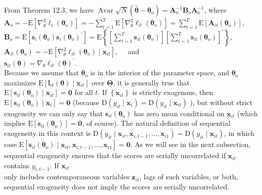\documentclass[10pt]{article}
\begin{document}
From Theorem 12.3, we have $\operatorname{Avar} \sqrt{N}\left(\hat{\boldsymbol{\theta}}-\boldsymbol{\theta}_{\mathrm{o}}\right)=\mathbf{A}_{\mathrm{o}}^{-1} \mathbf{B}_{\mathrm{o}} \mathbf{A}_{\mathrm{o}}^{-1}$, where\\
$\mathbf{A}_{\mathrm{o}}=-\mathrm{E}\left[\nabla_{\theta}^{2} \ell_{i}\left(\boldsymbol{\theta}_{\mathrm{o}}\right)\right]=-\sum_{t=1}^{T} \mathrm{E}\left[\nabla_{\theta}^{2} \ell_{i t}\left(\boldsymbol{\theta}_{\mathrm{o}}\right)\right]=\sum_{t=1}^{T} \mathrm{E}\left[\mathbf{A}_{i t}\left(\boldsymbol{\theta}_{\mathrm{o}}\right)\right]$,\\
$\mathbf{B}_{\mathrm{o}}=\mathrm{E}\left[\mathbf{s}_{i}\left(\boldsymbol{\theta}_{\mathrm{o}}\right) \mathbf{s}_{i}\left(\boldsymbol{\theta}_{\mathrm{o}}\right)^{\prime}\right]=\mathrm{E}\left\{\left[\sum_{t=1}^{T} \mathbf{s}_{i t}\left(\boldsymbol{\theta}_{\mathrm{o}}\right)\right]\left[\sum_{t=1}^{T} \mathbf{s}_{i t}\left(\boldsymbol{\theta}_{\mathrm{o}}\right)\right]^{\prime}\right\}$,\\
$\mathbf{A}_{i t}\left(\boldsymbol{\theta}_{\mathrm{o}}\right)=-\mathrm{E}\left[\nabla_{\theta}^{2} \ell_{i t}\left(\boldsymbol{\theta}_{\mathrm{o}}\right) \mid \mathbf{x}_{i t}\right], \quad$ and\\
$\mathbf{s}_{i t}(\boldsymbol{\theta})=\nabla_{\theta} \ell_{i t}(\boldsymbol{\theta})^{\prime}$.\\
Because we assume that $\boldsymbol{\theta}_{\mathrm{o}}$ is in the interior of the parameter space, and $\boldsymbol{\theta}_{\mathrm{o}}$ maximizes $\mathrm{E}\left[\boldsymbol{l}_{i t}(\boldsymbol{\theta}) \mid \mathbf{x}_{i t}\right]$ over $\boldsymbol{\Theta}$, it is generally true that $\mathrm{E}\left[\mathbf{s}_{i t}\left(\boldsymbol{\theta}_{\mathrm{o}}\right) \mid \mathbf{x}_{i t}\right]=\mathbf{0}$ for all $t$. If $\left\{\mathbf{x}_{i t}\right\}$ is strictly exogenous, then $\mathrm{E}\left[\mathbf{s}_{i t}\left(\boldsymbol{\theta}_{\mathrm{o}}\right) \mid \mathbf{x}_{i}\right]=\mathbf{0}$ (because $\mathrm{D}\left(y_{i t} \mid \mathbf{x}_{i}\right)=\mathrm{D}\left(y_{i t} \mid \mathbf{x}_{i t}\right)$ ), but without strict exogeneity we can only say that $\mathbf{s}_{i t}\left(\boldsymbol{\theta}_{\mathrm{o}}\right)$ has zero mean conditional on $\mathbf{x}_{i t}$ (which implies $\mathrm{E}\left[\mathbf{s}_{i t}\left(\boldsymbol{\theta}_{\mathrm{o}}\right)\right]=\mathbf{0}$, of course). The natural definition of sequential exogeneity in this context is $\mathrm{D}\left(y_{i t} \mid \mathbf{x}_{i t}, \mathbf{x}_{i, t-1}, \ldots, \mathbf{x}_{i 1}\right)=\mathrm{D}\left(y_{i t} \mid \mathbf{x}_{i t}\right)$, in which case $\mathrm{E}\left[\mathbf{s}_{i t}\left(\boldsymbol{\theta}_{\mathrm{o}}\right) \mid \mathbf{x}_{i t}, \mathbf{x}_{i, t-1}, \ldots, \mathbf{x}_{i 1}\right]=\mathbf{0}$. As we will see in the next subsection, sequential exogeneity ensures that the scores are serially uncorrelated if $\mathbf{x}_{i t}$ contains $y_{i, t-1}$. If $\mathbf{x}_{i t}$\\
only includes contemporaneous variables $\mathbf{z}_{i t}$, lags of such variables, or both, sequential exogeneity does not imply the scores are serially uncorrelated.
\end{document}
